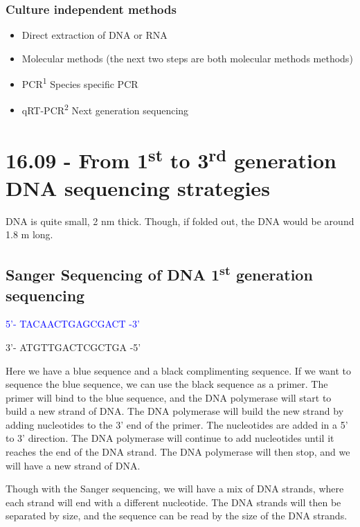 \subsubsection*{Culture independent methods}

\begin{highlight}
    \begin{itemize}
        \item Direct extraction of DNA or RNA
        \item Molecular methods (the next two steps are both molecular methods methods) 
        \item PCR\textsuperscript{1}
        \subitem Species specific PCR
        \item qRT-PCR\textsuperscript{2}
        \subitem Next generation sequencing
    \end{itemize}
\end{highlight}

\section{16.09 - From 1\texorpdfstring{\textsuperscript{st}}{st} to 3\texorpdfstring{\textsuperscript{rd}}{rd} generation DNA sequencing strategies}

DNA is quite small, 2 nm thick. Though, if folded out, the DNA would be around 1.8 m long. 


\subsection{Sanger Sequencing of DNA 1\texorpdfstring{\textsuperscript{st}}{st} generation sequencing}

\textcolor{blue}{5'- TACAACTGAGCGACT -3'}

3'- ATGTTGACTCGCTGA -5'

Here we have a blue sequence and a black complimenting sequence. If we want to sequence the blue sequence, we can use the black sequence as a primer. The primer will bind to the blue sequence, and the DNA polymerase will start to build a new strand of DNA. The DNA polymerase will build the new strand by adding nucleotides to the 3' end of the primer. The nucleotides are added in a 5' to 3' direction. The DNA polymerase will continue to add nucleotides until it reaches the end of the DNA strand. The DNA polymerase will then stop, and we will have a new strand of DNA. 

Though with the Sanger sequencing, we will have a mix of DNA strands, where each strand will end with a different nucleotide. The DNA strands will then be separated by size, and the sequence can be read by the size of the DNA strands.

